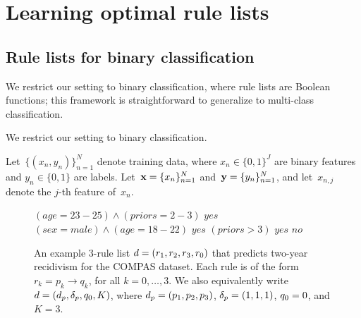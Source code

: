 \section{Learning optimal rule lists}

\subsection{Rule lists for binary classification}
\label{sec:setup}

\begin{arxiv}
We restrict our setting to binary classification,
where rule lists are Boolean functions;
this framework is straightforward to generalize to multi-class classification.
\end{arxiv}
\begin{kdd}
We restrict our setting to binary classification.
\end{kdd}
%
Let~${\{(x_n, y_n)\}_{n=1}^N}$ denote training data,
where ${x_n \in \{0, 1\}^J}$ are binary features and ${y_n \in \{0, 1\}}$ are labels.
%
Let~${\mathbf{x} = \{x_n\}_{n=1}^N}$ and~${\mathbf{y} = \{y_n\}_{n=1}^N}$,
and let~${x_{n,j}}$ denote the $j$-th feature of~$x_n$.

\begin{figure}[t!]
\begin{algorithmic}
\normalsize
\State \bif $(age=23-25) \wedge (priors=2-3)$ \bthen $yes$
\State \belif $(sex=male) \wedge (age=18-22)$ \bthen $yes$
\State \belif $(priors>3)$ \bthen $yes$
\State \belse $no$
\end{algorithmic}
\caption{An example 3-rule list ${{d} = (r_1, r_2, r_3, r_0)}$
that predicts two-year recidivism for the COMPAS dataset.
Each rule is of the form ${r_k = p_k \rightarrow q_k}$,
for all ${k = 0, \dots, 3}$.
We also equivalently write ${{d} = (d_p, \delta_p, q_0, K)}$,
where ${d_p = (p_1, p_2, p_3)}$, ${\delta_p = (1, 1, 1)}$,
${q_0 = 0}$, and ${K=3}$.
}
\label{fig:rule-list}
\end{figure}

